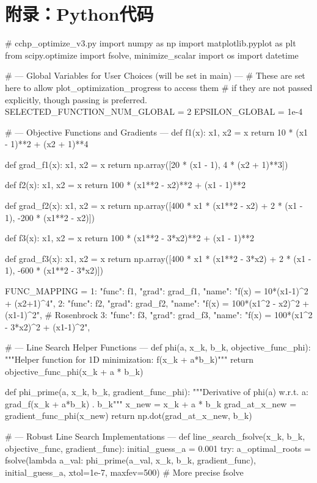 \documentclass[12pt]{article} %
\begin{document}
\appendix
\section{附录：Python代码}
\begin{python}
# cchp_optimize_v3.py
import numpy as np
import matplotlib.pyplot as plt
from scipy.optimize import fsolve, minimize_scalar
import os
import datetime

# --- Global Variables for User Choices (will be set in main) ---
# These are set here to allow plot_optimization_progress to access them
# if they are not passed explicitly, though passing is preferred.
SELECTED_FUNCTION_NUM_GLOBAL = 2
EPSILON_GLOBAL = 1e-4

# --- Objective Functions and Gradients ---
def f1(x):
    x1, x2 = x
    return 10 * (x1 - 1)**2 + (x2 + 1)**4

def grad_f1(x):
    x1, x2 = x
    return np.array([20 * (x1 - 1), 4 * (x2 + 1)**3])

def f2(x):
    x1, x2 = x
    return 100 * (x1**2 - x2)**2 + (x1 - 1)**2

def grad_f2(x):
    x1, x2 = x
    return np.array([400 * x1 * (x1**2 - x2) + 2 * (x1 - 1), -200 * (x1**2 - x2)])

def f3(x):
    x1, x2 = x
    return 100 * (x1**2 - 3*x2)**2 + (x1 - 1)**2

def grad_f3(x):
    x1, x2 = x
    return np.array([400 * x1 * (x1**2 - 3*x2) + 2 * (x1 - 1), -600 * (x1**2 - 3*x2)])

FUNC_MAPPING = {
    1: {"func": f1, "grad": grad_f1, "name": "f(x) = 10*(x1-1)^2 + (x2+1)^4"},
    2: {"func": f2, "grad": grad_f2, "name": "f(x) = 100*(x1^2 - x2)^2 + (x1-1)^2"}, # Rosenbrock
    3: {"func": f3, "grad": grad_f3, "name": "f(x) = 100*(x1^2 - 3*x2)^2 + (x1-1)^2"},
}

# --- Line Search Helper Functions ---
def phi(a, x_k, b_k, objective_func_phi):
    """Helper function for 1D minimization: f(x_k + a*b_k)"""
    return objective_func_phi(x_k + a * b_k)

def phi_prime(a, x_k, b_k, gradient_func_phi):
    """Derivative of phi(a) w.r.t. a: grad_f(x_k + a*b_k) . b_k"""
    x_new = x_k + a * b_k
    grad_at_x_new = gradient_func_phi(x_new)
    return np.dot(grad_at_x_new, b_k)

# --- Robust Line Search Implementations ---
def line_search_fsolve(x_k, b_k, objective_func, gradient_func):
    initial_guess_a = 0.001 
    try:
        a_optimal_roots = fsolve(lambda a_val: phi_prime(a_val, x_k, b_k, gradient_func),
                                 initial_guess_a, xtol=1e-7, maxfev=500) # More precise fsolve
        

\end{python}
\end{document}
